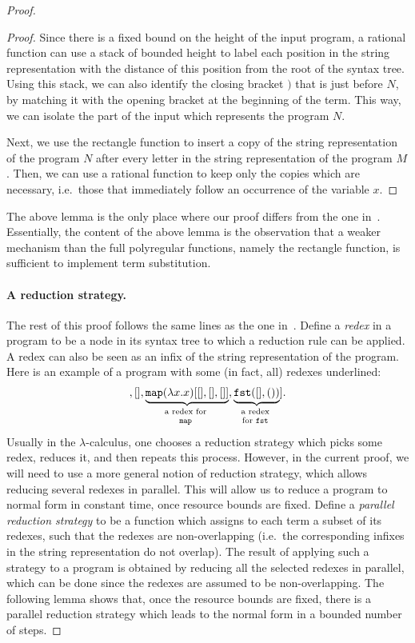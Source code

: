 \begin{proof}
\begin{proof}
        Since there is a fixed bound on the height of the input program, a rational function can use a stack of bounded height to  label each position in the string representation with the distance of this position from the root of the syntax tree. Using this stack, we can also identify the closing bracket $)$ that is just before $N$, by matching it with the opening bracket at the beginning of the term. This way, we can isolate the part of the input which represents the program $N$. 

           Next, we use the rectangle function to insert a copy of the string representation of the program $N$ after every letter in the string representation of the program $M$. Then, we can use a rational function to keep only the copies which are necessary, i.e.~those that immediately follow an occurrence of the variable $x$. 
    \end{proof}
    The above lemma is the only place where our proof differs from the one in~\cite{polyregular-survey}. Essentially, the content of the above lemma is the  observation that a weaker mechanism than the full polyregular functions, namely the rectangle function, is sufficient to implement term substitution.

    \paragraph*{A reduction strategy.} The rest of this proof follows the same lines as the one in~\cite[Theorem 4.1]{polyregular-survey}. Define a \emph{redex} in a program to be a node in its syntax tree to which a reduction rule can be applied. A redex can also be seen as an infix of the string representation of the program. Here is an example of a program with some (in fact, all) redexes underlined:
    \begin{align*}
    [ \myunderbrace{(\lambda x.x) []}{a redex for \\ $\lambda$-abstraction}, [], [], \myunderbrace{\mapterm (\lambda x. x) [[],[],[]]}{a redex for \\ $\mapterm$}, \myunderbrace{\fstterm ([],())}{a redex \\ for $\fstterm$}].
    \end{align*}
    Usually in the $\lambda$-calculus, one chooses a reduction strategy which picks some redex, reduces it, and then repeats this process. However, in the current proof, we will need to use a more general notion of reduction strategy, which allows reducing several redexes in parallel. This will allow us to reduce a program to normal form in constant time, once resource bounds are fixed. Define a 
     \emph{parallel reduction strategy} to be a function which assigns to each term a subset of its redexes, such that the redexes are non-overlapping (i.e.~the corresponding infixes in the string representation do not overlap). The result of applying such a strategy to a program is obtained by reducing all the selected redexes in parallel, which can be done since the redexes are assumed to be non-overlapping. The following lemma shows that, once the resource bounds are fixed, there is a parallel reduction strategy which leads to the normal form in a bounded number of steps.
     


\end{proof}
